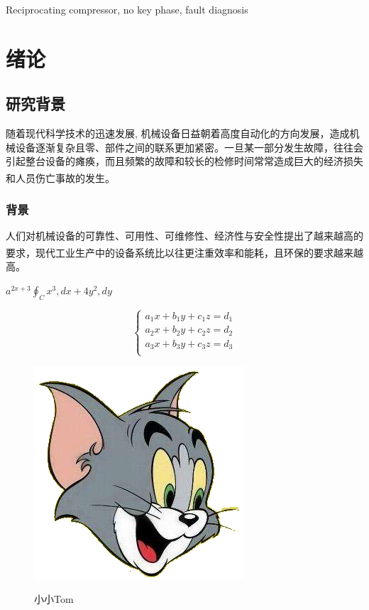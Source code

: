 \documentclass{buctart}
\begin{document}
	{Reciprocating compressor, no key phase, fault diagnosis}%
\clearpage
\tableofcontents%
\clearpage
{}
\symbolpage
\startmain
\section{绪论}
\subsection{研究背景}{\par
	随着现代科学技术的迅速发展, 机械设备日益朝着高度自动化的方向发展，造成机械设备逐渐复杂且零、部件之间的联系更加紧密。一旦某一部分发生故障，往往会引起整台设备的瘫痪，而且频繁的故障和较长的检修时间常常造成巨大的经济损失和人员伤亡事故的发生\textsuperscript{\cite{zjsw}}。\par}
\subsubsection{背景}{
	人们对机械设备的可靠性、可用性、可维修性、经济性与安全性提出了越来越高的要求，现代工业生产中的设备系统比以往更注重效率和能耗\textsuperscript{\cite{kocher99}}，且环保的要求越来越高\cite{Krasnogor2004e}。\par}
	$a^{2x+3} 	\oint_{C} x^3, dx + 4y^2, dy$\par
	$$\begin{cases}
	a_1x+b_1y+c_1z=d_1\\
	a_2x+b_2y+c_2z=d_2\\
	a_3x+b_3y+c_3z=d_3\\
	\end{cases}
	$$
	\begin{figure}[htbp]
		\begin{center}
			\includegraphics[scale=1.1]{image/tom.jpeg}\\
			\caption{小小Tom}
		\end{center}
	\end{figure}
	
\end{document}

